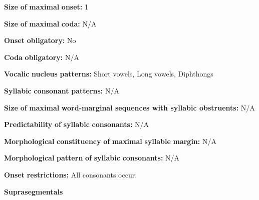 \begin{styleBody}
\textbf{Size} \textbf{of} \textbf{maximal} \textbf{onset:} 1
\end{styleBody}

\begin{styleBody}
\textbf{Size} \textbf{of} \textbf{maximal} \textbf{coda:} N/A
\end{styleBody}

\begin{styleBody}
\textbf{Onset} \textbf{obligatory:} No
\end{styleBody}

\begin{styleBody}
\textbf{Coda} \textbf{obligatory:} N/A
\end{styleBody}

\begin{styleBody}
\textbf{Vocalic} \textbf{nucleus} \textbf{patterns:} Short vowels, Long vowels, Diphthongs
\end{styleBody}

\begin{styleBody}
\textbf{Syllabic} \textbf{consonant} \textbf{patterns:} N/A
\end{styleBody}

\begin{styleBody}
\textbf{Size} \textbf{of} \textbf{maximal} \textbf{word{}-marginal sequences with syllabic obstruents:} N/A
\end{styleBody}

\begin{styleBody}
\textbf{Predictability} \textbf{of} \textbf{syllabic} \textbf{consonants:} N/A
\end{styleBody}

\begin{styleBody}
\textbf{Morphological} \textbf{constituency} \textbf{of} \textbf{maximal} \textbf{syllable} \textbf{margin:} N/A
\end{styleBody}

\begin{styleBody}
\textbf{Morphological} \textbf{pattern} \textbf{of} \textbf{syllabic} \textbf{consonants:} N/A
\end{styleBody}

\begin{styleBody}
\textbf{Onset} \textbf{restrictions:} All consonants occur.
\end{styleBody}

\begin{styleBody}
\textbf{Suprasegmentals}
\end{styleBody}

